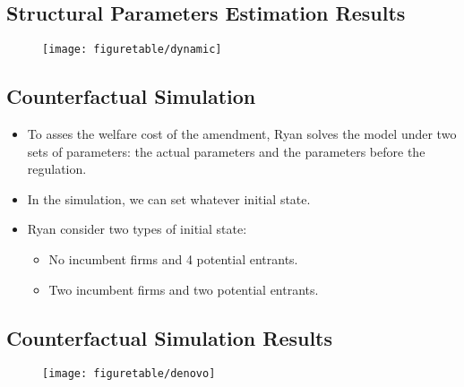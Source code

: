 \documentclass[
]{book}
\providecommand{\tightlist}{%
  \setlength{\itemsep}{0pt}\setlength{\parskip}{0pt}}
\begin{document}
\hypertarget{structural-parameters-estimation-results}{%
\subsection{Structural Parameters Estimation Results}\label{structural-parameters-estimation-results}}

\begin{figure}

{\centering \texttt{[image: figuretable/dynamic]} 

}

\end{figure}

\hypertarget{counterfactual-simulation}{%
\subsection{Counterfactual Simulation}\label{counterfactual-simulation}}

\begin{itemize}
\tightlist
\item
  To asses the welfare cost of the amendment, Ryan solves the model
  under two sets of parameters: the actual parameters and the
  parameters before the regulation.
\item
  In the simulation, we can set whatever initial state.
\item
  Ryan consider two types of initial state:

  \begin{itemize}
  \tightlist
  \item
    No incumbent firms and 4 potential entrants.
  \item
    Two incumbent firms and two potential entrants.
  \end{itemize}
\end{itemize}

\hypertarget{counterfactual-simulation-results}{%
\subsection{Counterfactual Simulation Results}\label{counterfactual-simulation-results}}

\begin{figure}

{\centering \texttt{[image: figuretable/denovo]} 

}

\end{figure}
\end{document}
